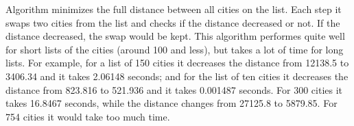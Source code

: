 \documentclass[a4paper, 12pt]{article}
\begin{document}
\begin{enumerate}
	
	Algorithm minimizes the full distance between all cities on the list. Each step it swaps two cities from the list and checks if the distance decreased or not. If the distance decreased, the swap would be kept. This algorithm performes quite well for short lists of the cities (around 100 and less), but takes a lot of time for long lists.  For example, for a list of 150 cities it decreases the distance from 12138.5 to 3406.34 and it takes 2.06148 seconds; and for the list of ten cities it decreases the distance from 823.816 to 521.936 and it takes 0.001487 seconds. For 300 cities it takes 16.8467 seconds, while the distance changes from 27125.8 to 5879.85. For 754 cities it would take too much time.
	
    \end{enumerate}
    
\end{document}
